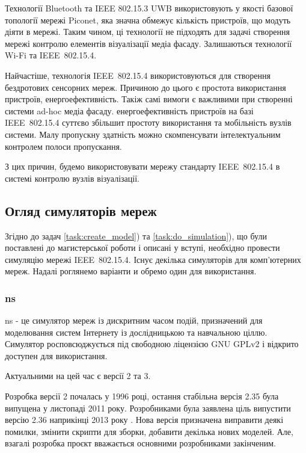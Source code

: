 \documentclass[a4paper,ukrainian,utf8,nocolumnsxix,floatsection,equationsection]{eskdtext}
\renewcommand\paragraph{\subsubsection}
\newcommand{\todoi}[1]{\todo[inline]{#1}}
\newcommand{\iee}[0]{IEEE~802.15.4\xspace}
\begin{document}

Технології Bluetooth та IEEE 802.15.3 UWB використовують у якості базової топології мережі Piconet, яка значна обмежує кількість пристроїв, що модуть діяти в мережі. Таким чином, ці технології не підходять для задачі створення мережі контролю елементів візуалізації медіа фасаду. Залишаються технології Wi-Fi та \iee. 

Найчастіше, технологія \iee використовуються для створення бездротових сенсорних мереж. Причиною до цього є простота використання пристроїв, енергоефективність. Такіж самі вимоги є важливими при створенні системи ad-hoc медіа фасаду. енергоефективність пристроїв на базі \iee суттєво збільшит простоту використання та мобільність вузлів системи. Малу пропускну здатність можно скомпенсувати інтелектуальним контролем полоси пропускання.

З цих причин, будемо використовувати мережу стандарту \iee в системі контролю вузлів візуалізації.




\subsection{Огляд симуляторів мереж}

Згідно до задач \ref{task:create_model}) та \ref{task:do_simulation}), що були поставлені до магистерської роботи і описані у вступі, необхідно провести симуляцію мережі \iee. Існує декілька симуляторів для комп'ютерних мереж. Надалі роглянемо варіанти и обремо один для використання.

\paragraph{ns}
\label{par:ns}

ns - це симулятор мереж із дискритним часом подій, призначений для моделювання систем Інтернету із дослідницькою та навчальною ціллю. Симулятор росповсюджується під свободною ліцензією GNU GPLv2 і відкрито доступен для використання.

Актуальними на цей час є версії 2 та 3. 

Розробка версії 2 почалась у 1996 році, остання стабільна версія 2.35 була випущена у листопаді 2011 року. Розробниками була заявлена ціль випустити версію 2.36 наприкінці 2013 року \cite{nsnam:roadmap}. Нова версія призначена виправити деякі помилки, змінити скрипти для зборки, добавити декілька нових моделей. Але, взагалі розробка проєкт вважається основними розробниками закінченим.
\end{document}
